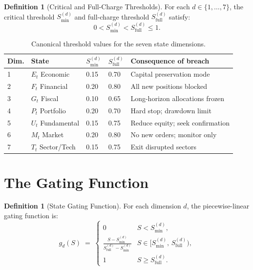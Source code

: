 \documentclass[12pt,openany]{book}
\newcommand{\calE}{\mathcal{E}}
\newcommand{\calF}{\mathcal{F}}
\newcommand{\calG}{\mathcal{G}}
\newcommand{\calP}{\mathcal{P}}
\newcommand{\calU}{\mathcal{U}}
\newcommand{\calM}{\mathcal{M}}
\newcommand{\calT}{\mathcal{T}}
\numberwithin{equation}{chapter}
\theoremstyle{plain}
\theoremstyle{definition}
\newtheorem{definition}[theorem]{Definition}
\theoremstyle{remark}
\def\mathcal#1{#1}%
\def\calE{E}%
\def\calF{F}%
\def\calG{G}%
\def\calP{P}%
\def\calU{U}%
\def\calM{M}%
\def\calT{T}%
\begin{document}
\begin{definition}[Critical and Full-Charge Thresholds]
\label{def:thresholds}
For each $d \in \{1,\ldots,7\}$, the critical threshold
$\mathcal{S}_{\min}^{(d)}$ and full-charge threshold
$\mathcal{S}_{\mathrm{full}}^{(d)}$ satisfy:
\begin{equation}
  0 < \mathcal{S}_{\min}^{(d)} < \mathcal{S}_{\mathrm{full}}^{(d)} \leq 1.
\end{equation}
\end{definition}

\begin{table}[H]
\centering
\caption{Canonical threshold values for the seven state dimensions.}
\label{tab:thresholds}
\small
\begin{tabularx}{\textwidth}{@{} l l l l l @{}}
\toprule
\textbf{Dim.} & \textbf{State} & $\mathcal{S}_{\min}^{(d)}$
  & $\mathcal{S}_{\mathrm{full}}^{(d)}$ & \textbf{Consequence of breach} \\
\midrule
1 & $\calE_t$ Economic    & 0.15 & 0.70 & Capital preservation mode \\
2 & $\calF_t$ Financial   & 0.20 & 0.80 & All new positions blocked \\
3 & $\calG_t$ Fiscal      & 0.10 & 0.65 & Long-horizon allocations frozen \\
4 & $\calP_t$ Portfolio   & 0.20 & 0.70 & Hard stop; drawdown limit \\
5 & $\calU_t$ Fundamental & 0.15 & 0.75 & Reduce equity; seek confirmation \\
6 & $\calM_t$ Market      & 0.20 & 0.80 & No new orders; monitor only \\
7 & $\calT_t$ Sector/Tech & 0.15 & 0.75 & Exit disrupted sectors \\
\bottomrule
\end{tabularx}
\end{table}

\section{The Gating Function}

\begin{definition}[State Gating Function]
\label{def:gating-function}
For each dimension $d$, the piecewise-linear gating function is:
\begin{equation}
  g_d(\mathcal{S}) \;=\; \begin{cases}
    0
      & \mathcal{S} < \mathcal{S}_{\min}^{(d)}, \\[4pt]
    \displaystyle\frac{\mathcal{S} - \mathcal{S}_{\min}^{(d)}}
                      {\mathcal{S}_{\mathrm{full}}^{(d)} - \mathcal{S}_{\min}^{(d)}}
      & \mathcal{S} \in \bigl[\mathcal{S}_{\min}^{(d)},\,
                               \mathcal{S}_{\mathrm{full}}^{(d)}\bigr), \\[4pt]
    1
      & \mathcal{S} \geq \mathcal{S}_{\mathrm{full}}^{(d)}.
  \end{cases}
  \label{eq:gating-function}
\end{equation}
\end{definition}
\end{document}
